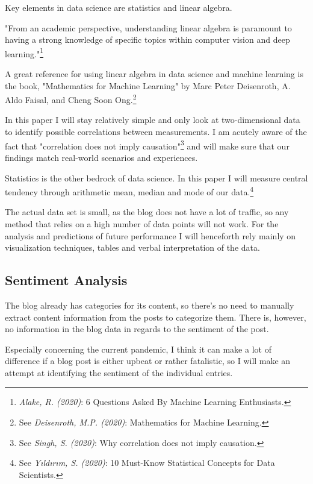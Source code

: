 Key elements in data science are statistics and linear algebra.

"From an academic perspective, understanding linear algebra is paramount to having a strong knowledge of specific topics within computer vision and deep learning."\footnote{\textit{Alake, R. (2020)}: 6 Questions Asked By Machine Learning Enthusiasts.\cite{sixQuestions}}

A great reference for using linear algebra in data science and machine learning is the book, "Mathematics for Machine Learning" by Marc Peter Deisenroth, A. Aldo Faisal, and Cheng Soon Ong.\footnote{See \textit{Deisenroth, M.P. (2020)}: Mathematics for Machine Learning.\cite{mathematicsML}}

In this paper I will stay relatively simple and only look at two-dimensional data to identify possible correlations between measurements. I am acutely aware of the fact that "correlation does not imply causation"\footnote{See \textit{Singh, S. (2020)}: Why correlation does not imply causation.\cite{correlateCause}} and will make sure that our findings match real-world scenarios and experiences.

Statistics is the other bedrock of data science. In this paper I will measure central tendency through arithmetic mean, median and mode of our data.\footnote{See \textit{Yıldırım, S. (2020)}: 10 Must-Know Statistical Concepts for Data Scientists.\cite{bedrockScience}}

The actual data set is small, as the blog does not have a lot of traffic, so any method that relies on a high number of data points will not work. For the analysis and predictions of future performance I will henceforth rely mainly on visualization techniques, tables and verbal interpretation of the data.

\subsection{Sentiment Analysis}

The blog already has categories for its content, so there's no need to manually extract content information from the posts to categorize them. There is, however, no information in the blog data in regards to the sentiment of the post.

Especially concerning the current pandemic, I think it can make a lot of difference if a blog post is either upbeat or rather fatalistic, so I will make an attempt at identifying the sentiment of the individual entries.

